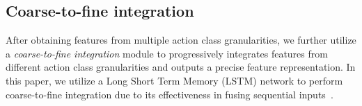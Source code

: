 \documentclass[letterpaper]{article} %
\begin{document}

\subsection{Coarse-to-fine integration}\label{integration}

After obtaining features from multiple action class granularities, we further utilize a \emph{coarse-to-fine integration} module to progressively integrates features from different action class granularities and outputs a precise feature representation. In this paper, we utilize a Long Short Term Memory (LSTM) network to perform coarse-to-fine integration due to its effectiveness in fusing sequential inputs~\cite{LSTM,LSTM2}.
\end{document}
